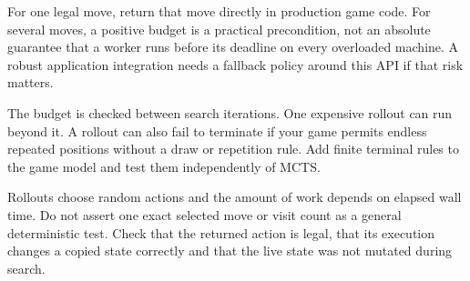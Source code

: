 \documentclass[11pt,a4paper]{article}
\begin{document}
For one legal move, return that move directly in production game code. For several moves, a positive budget is a practical precondition, not an absolute guarantee that a worker runs before its deadline on every overloaded machine. A robust application integration needs a fallback policy around this API if that risk matters.

The budget is checked between search iterations. One expensive rollout can run beyond it. A rollout can also fail to terminate if your game permits endless repeated positions without a draw or repetition rule. Add finite terminal rules to the game model and test them independently of MCTS.

Rollouts choose random actions and the amount of work depends on elapsed wall time. Do not assert one exact selected move or visit count as a general deterministic test. Check that the returned action is legal, that its execution changes a copied state correctly and that the live state was not mutated during search.
\end{document}
